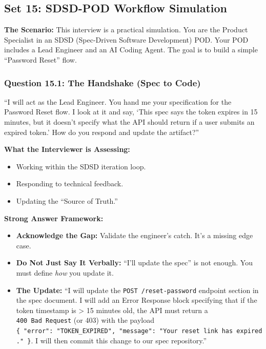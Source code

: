 \documentclass[
  11pt,
  openany,
  oneside]{book}
\providecommand{\tightlist}{%
  \setlength{\itemsep}{0pt}\setlength{\parskip}{0pt}}
\begin{document}
\bigskip

\subsection{Set 15: SDSD-POD Workflow
Simulation}\label{set-15-sdsd-pod-workflow-simulation}

\textbf{The Scenario:} This interview is a practical simulation. You are
the Product Specialist in an SDSD (Spec-Driven Software Development)
POD. Your POD includes a Lead Engineer and an AI Coding Agent. The goal
is to build a simple ``Password Reset'' flow.

\subsubsection{Question 15.1: The Handshake (Spec to
Code)}\label{question-15.1-the-handshake-spec-to-code}

``I will act as the Lead Engineer. You hand me your specification for
the Password Reset flow. I look at it and say, `This spec says the token
expires in 15 minutes, but it doesn't specify what the API should return
if a user submits an expired token.' How do you respond and update the
artifact?''

\textbf{What the Interviewer is Assessing:}

\begin{itemize}
\tightlist
\item
  Working within the SDSD iteration loop.
\item
  Responding to technical feedback.
\item
  Updating the ``Source of Truth.''
\end{itemize}

\textbf{Strong Answer Framework:}

\begin{itemize}
\tightlist
\item
  \textbf{Acknowledge the Gap:} Validate the engineer's catch. It's a
  missing edge case.
\item
  \textbf{Do Not Just Say It Verbally:} ``I'll update the spec'' is not
  enough. You must define \emph{how} you update it.
\item
  \textbf{The Update:} ``I will update the
  \texttt{POST\ /reset-password} endpoint section in the spec document.
  I will add an Error Response block specifying that if the token
  timestamp is \textgreater{} 15 minutes old, the API must return a
  \texttt{400\ Bad\ Request} (or 403) with the payload
  \texttt{\{\ "error":\ "TOKEN\_EXPIRED",\ "message":\ "Your\ reset\ link\ has\ expired."\ \}}.
  I will then commit this change to our spec repository.''
\end{itemize}
\end{document}
